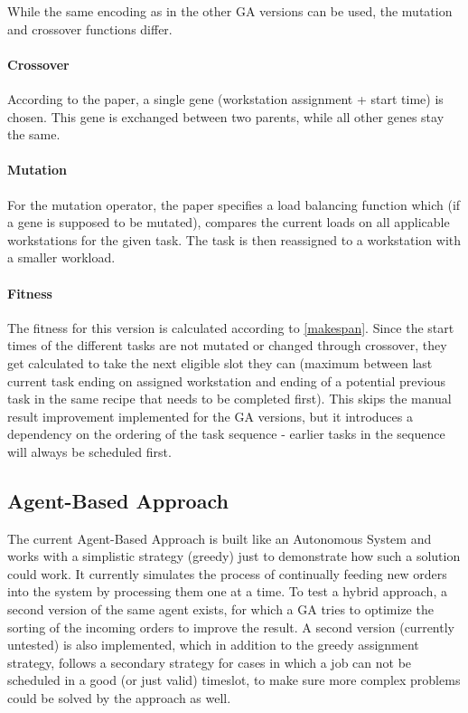 \documentclass[a4paper,12pt,twoside]{scrreprt}
\begin{document}
\begin{flushleft}
While the same encoding as in the other GA versions can be used, the mutation and crossover functions differ.
\paragraph{Crossover}
According to the paper, a single gene (workstation assignment + start time) is chosen. This gene is exchanged between two parents, while all other genes stay the same.

\paragraph{Mutation}
For the mutation operator, the paper specifies a load balancing function which (if a gene is supposed to be mutated), compares the current loads on all applicable workstations for the given task. The task is then reassigned to a workstation with a smaller workload.

\paragraph{Fitness}
The fitness for this version is calculated according to \autoref{makespan}. Since the start times of the different tasks are not mutated or changed through crossover, they get calculated to take the next eligible slot they can (maximum between last current task ending on assigned workstation and ending of a potential previous task in the same recipe that needs to be completed first). This skips the manual result improvement implemented for the GA versions, but it introduces a dependency on the ordering of the task sequence - earlier tasks in the sequence will always be scheduled first.



\subsection{Agent-Based Approach}

The current Agent-Based Approach is built like an Autonomous System and works with a simplistic strategy (greedy) just to demonstrate how such a solution could work.
It currently simulates the process of continually feeding new orders into the system by processing them one at a time.
To test a hybrid approach, a second version of the same agent exists, for which a GA tries to optimize the sorting of the incoming orders to improve the result.
A second version (currently untested) is also implemented, which in addition to the greedy assignment strategy, follows a secondary strategy for cases in which a job can not be scheduled in a good (or just valid) timeslot, to make sure more complex problems could be solved by the approach as well.
\newline
\newline


\end{flushleft}
\end{document}
